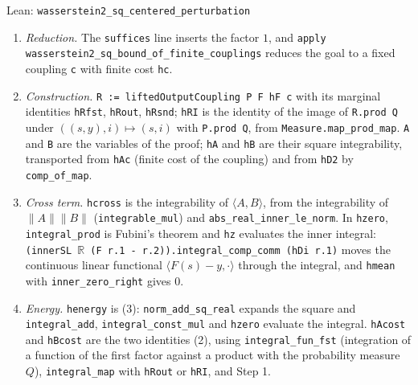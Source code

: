 \documentclass[11pt,a4paper]{report}
\begin{document}
\begin{leanbox}{Lean: \texttt{wasserstein2\_\allowbreak{}sq\_\allowbreak{}centered\_\allowbreak{}perturbation}}
\begin{enumerate}
\item \emph{Reduction.} The \texttt{suffices} line inserts the factor \(1\), and \texttt{apply wasserstein2\_\allowbreak{}sq\_\allowbreak{}bound\_\allowbreak{}of\_\allowbreak{}finite\_\allowbreak{}couplings} reduces the goal to a fixed coupling \texttt{c} with finite cost \texttt{hc}.

\item \emph{Construction.} \texttt{R := lifted\allowbreak{}Output\allowbreak{}Coupling P F h\allowbreak{}F c} with its marginal identities \texttt{h\allowbreak{}Rfst}, \texttt{h\allowbreak{}Rout}, \texttt{h\allowbreak{}Rsnd}; \texttt{h\allowbreak{}RI} is the identity of the image of \texttt{R.\allowbreak{}prod Q} under \(((s,y),i)\mapsto(s,i)\) with \texttt{P.\allowbreak{}prod Q}, from \texttt{Measure.\allowbreak{}map\_\allowbreak{}prod\_\allowbreak{}map}. \texttt{A} and \texttt{B} are the variables of the proof; \texttt{h\allowbreak{}A} and \texttt{h\allowbreak{}B} are their square integrability, transported from \texttt{h\allowbreak{}Ac} (finite cost of the coupling) and from \texttt{h\allowbreak{}D2} by \texttt{comp\_\allowbreak{}of\_\allowbreak{}map}.

\item \emph{Cross term.} \texttt{hcross} is the integrability of \(\langle A,B\rangle\), from the integrability of \(\|A\|\|B\|\) (\texttt{integrable\_\allowbreak{}mul}) and \texttt{abs\_\allowbreak{}real\_\allowbreak{}inner\_\allowbreak{}le\_\allowbreak{}norm}. In \texttt{hzero}, \texttt{integral\_\allowbreak{}prod} is Fubini's theorem and \texttt{hz} evaluates the inner integral: \texttt{(inner\allowbreak{}SL \ensuremath{\mathbb R} (F r.\allowbreak{}1 -\allowbreak{} r.\allowbreak{}2)).\allowbreak{}integral\_\allowbreak{}comp\_\allowbreak{}comm (h\allowbreak{}Di r.\allowbreak{}1)} moves the continuous linear functional \(\langle F(s)-y,\cdot\rangle\) through the integral, and \texttt{hmean} with \texttt{inner\_\allowbreak{}zero\_\allowbreak{}right} gives \(0\).

\item \emph{Energy.} \texttt{henergy} is (3): \texttt{norm\_\allowbreak{}add\_\allowbreak{}sq\_\allowbreak{}real} expands the square and \texttt{integral\_\allowbreak{}add}, \texttt{integral\_\allowbreak{}const\_\allowbreak{}mul} and \texttt{hzero} evaluate the integral. \texttt{h\allowbreak{}Acost} and \texttt{h\allowbreak{}Bcost} are the two identities (2), using \texttt{integral\_\allowbreak{}fun\_\allowbreak{}fst} (integration of a function of the first factor against a product with the probability measure \(Q\)), \texttt{integral\_\allowbreak{}map} with \texttt{h\allowbreak{}Rout} or \texttt{h\allowbreak{}RI}, and Step 1.


\end{enumerate}
\end{leanbox}
\end{document}
